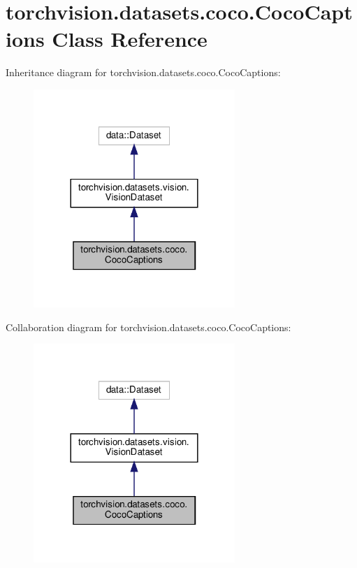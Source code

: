 \hypertarget{classtorchvision_1_1datasets_1_1coco_1_1CocoCaptions}{}\section{torchvision.\+datasets.\+coco.\+Coco\+Captions Class Reference}
\label{classtorchvision_1_1datasets_1_1coco_1_1CocoCaptions}


Inheritance diagram for torchvision.\+datasets.\+coco.\+Coco\+Captions\+:
\nopagebreak
\begin{figure}[H]
\begin{center}
\leavevmode
\includegraphics[width=216pt]{classtorchvision_1_1datasets_1_1coco_1_1CocoCaptions__inherit__graph}
\end{center}
\end{figure}


Collaboration diagram for torchvision.\+datasets.\+coco.\+Coco\+Captions\+:
\nopagebreak
\begin{figure}[H]
\begin{center}
\leavevmode
\includegraphics[width=216pt]{classtorchvision_1_1datasets_1_1coco_1_1CocoCaptions__coll__graph}
\end{center}
\end{figure}

